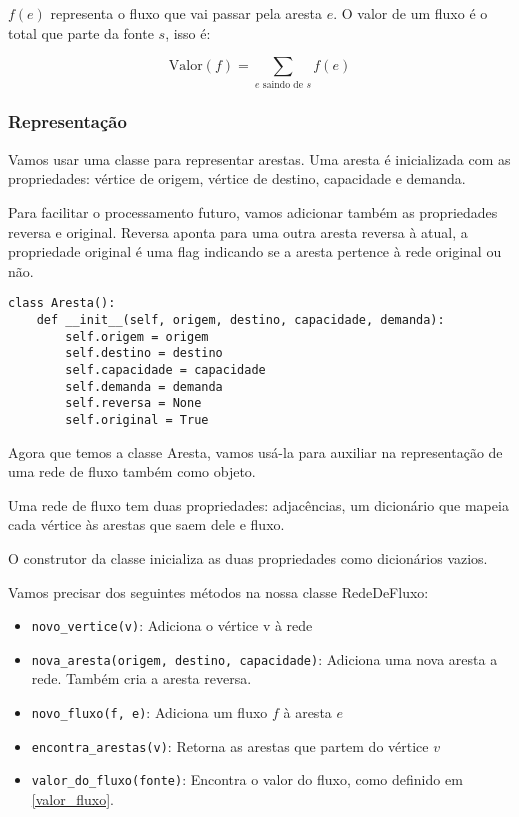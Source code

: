 \documentclass[11pt]{article}
\begin{document}
$f(e)$ representa o fluxo que vai passar pela aresta $e$. O valor de
um fluxo é o total que parte da fonte $s$, isso é:

\begin{equation}
\label{valor_fluxo} \mathrm{Valor}(f) = \sum_{e \text{ saindo de } s} f(e)
\end{equation}

\subsubsection{Representação}
\label{sec-2-2-2}

Vamos usar uma classe para representar arestas. Uma aresta é
inicializada com as propriedades: vértice de origem, vértice de
destino, capacidade e demanda.

Para facilitar o processamento futuro, vamos adicionar também as
propriedades reversa e original. Reversa aponta para uma outra aresta
reversa à atual, a propriedade original é uma flag indicando se a
aresta pertence à rede original ou não.
\begin{verbatim}
class Aresta():
    def __init__(self, origem, destino, capacidade, demanda):
        self.origem = origem
        self.destino = destino
        self.capacidade = capacidade
        self.demanda = demanda
        self.reversa = None
        self.original = True
\end{verbatim}

Agora que temos a classe Aresta, vamos usá-la para auxiliar na
representação de uma rede de fluxo também como objeto.

Uma rede de fluxo tem duas propriedades: adjacências, um dicionário
que mapeia cada vértice às arestas que saem dele e fluxo.

O construtor da classe inicializa as duas propriedades como dicionários vazios.

Vamos precisar dos seguintes métodos na nossa classe RedeDeFluxo:

\begin{itemize}
\item \verb~novo_vertice(v)~: Adiciona o vértice v à rede
\item \verb~nova_aresta(origem, destino, capacidade)~: Adiciona uma nova aresta a
rede. Também cria a aresta reversa.
\item \verb~novo_fluxo(f, e)~: Adiciona um fluxo $f$ à aresta $e$
\item \verb~encontra_arestas(v)~: Retorna as arestas que partem do vértice $v$
\item \verb~valor_do_fluxo(fonte)~: Encontra o valor do fluxo, como definido em \eqref{valor_fluxo}.
\end{itemize}
\end{document}
